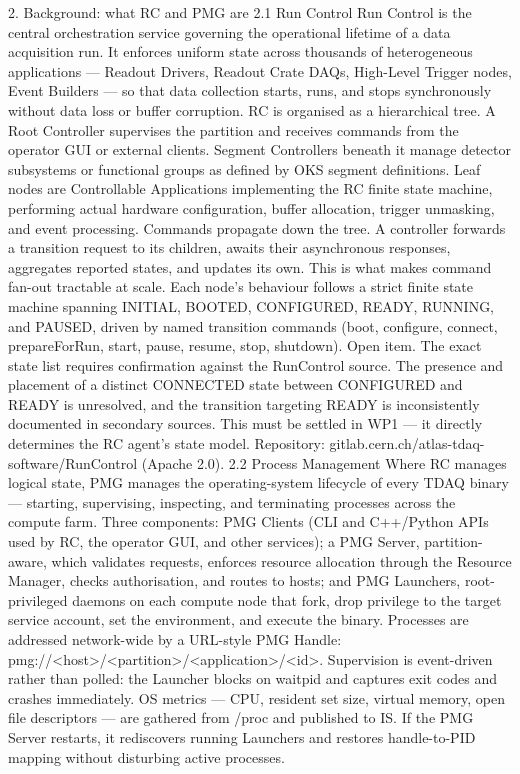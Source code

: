 2. Background: what RC and PMG are
2.1 Run Control
Run Control is the central orchestration service governing the operational lifetime of a data acquisition run. It enforces uniform state across thousands of heterogeneous applications — Readout Drivers, Readout Crate DAQs, High-Level Trigger nodes, Event Builders — so that data collection starts, runs, and stops synchronously without data loss or buffer corruption.
RC is organised as a hierarchical tree. A Root Controller supervises the partition and receives commands from the operator GUI or external clients. Segment Controllers beneath it manage detector subsystems or functional groups as defined by OKS segment definitions. Leaf nodes are Controllable Applications implementing the RC finite state machine, performing actual hardware configuration, buffer allocation, trigger unmasking, and event processing.
Commands propagate down the tree. A controller forwards a transition request to its children, awaits their asynchronous responses, aggregates reported states, and updates its own. This is what makes command fan-out tractable at scale.
Each node's behaviour follows a strict finite state machine spanning INITIAL, BOOTED, CONFIGURED, READY, RUNNING, and PAUSED, driven by named transition commands (boot, configure, connect, prepareForRun, start, pause, resume, stop, shutdown).
Open item. The exact state list requires confirmation against the RunControl source. The presence and placement of a distinct CONNECTED state between CONFIGURED and READY is unresolved, and the transition targeting READY is inconsistently documented in secondary sources. This must be settled in WP1 — it directly determines the RC agent's state model.
Repository: gitlab.cern.ch/atlas-tdaq-software/RunControl (Apache 2.0).
2.2 Process Management
Where RC manages logical state, PMG manages the operating-system lifecycle of every TDAQ binary — starting, supervising, inspecting, and terminating processes across the compute farm.
Three components: PMG Clients (CLI and C++/Python APIs used by RC, the operator GUI, and other services); a PMG Server, partition-aware, which validates requests, enforces resource allocation through the Resource Manager, checks authorisation, and routes to hosts; and PMG Launchers, root-privileged daemons on each compute node that fork, drop privilege to the target service account, set the environment, and execute the binary.
Processes are addressed network-wide by a URL-style PMG Handle: pmg://<host>/<partition>/<application>/<id>.
Supervision is event-driven rather than polled: the Launcher blocks on waitpid and captures exit codes and crashes immediately. OS metrics — CPU, resident set size, virtual memory, open file descriptors — are gathered from /proc and published to IS. If the PMG Server restarts, it rediscovers running Launchers and restores handle-to-PID mapping without disturbing active processes.
